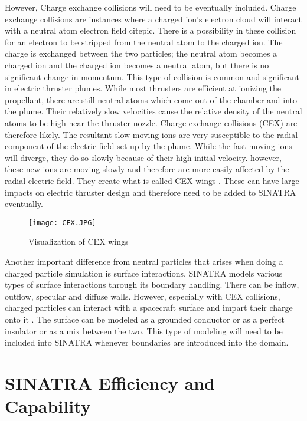 \indent However, Charge exchange collisions will need to be eventually included. Charge exchange collisions are instances where a charged ion’s electron cloud will interact with a neutral atom electron field cite{pic}. There is a possibility in these collision for an electron to be stripped from the neutral atom to the charged ion. The charge is exchanged between the two particles; the neutral atom becomes a charged ion and the charged ion becomes a neutral atom, but there is no significant change in momentum. This type of collision is common and significant in electric thruster plumes. While most thrusters are efficient at ionizing the propellant, there are still neutral atoms which come out of the chamber and into the plume. Their relatively slow velocities cause the relative density of the neutral atoms to be high near the thruster nozzle. Charge exchange collisions (CEX) are therefore likely. The resultant slow-moving ions are very susceptible to the radial component of the electric field set up by the plume. While the fast-moving ions will diverge, they do so slowly because of their high initial velocity. however, these new ions are moving slowly and therefore are more easily affected by the radial electric field. They create what is called CEX wings \cite{cex_wings}. These can have large impacts on electric thruster design and therefore need to be added to SINATRA eventually.


\begin{figure}
\texttt{[image: CEX.JPG]}
\centering
\caption{Visualization of CEX wings\cite{cex_wings}}
\label{fig:CEX}
\end{figure}

\indent Another important difference from neutral particles that arises when doing a charged particle simulation is surface interactions. SINATRA models various types of surface interactions through its boundary handling. There can be inflow, outflow, specular and diffuse walls. However, especially with CEX collisions, charged particles can interact with a spacecraft surface and impart their charge onto it \cite{surface_charge}. The surface can be modeled as a grounded conductor or as a perfect insulator or as a mix between the two. This type of modeling will need to be included into SINATRA whenever boundaries are introduced into the domain.

\section{SINATRA Efficiency and Capability}

